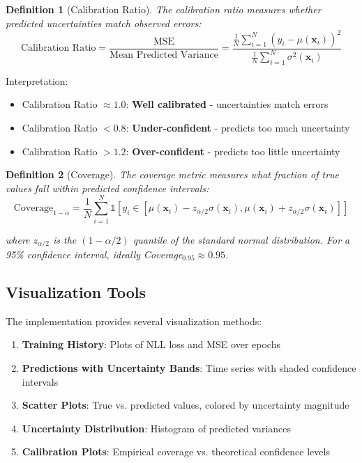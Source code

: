 \documentclass[11pt,a4paper]{article}
\newtheorem{definition}{Definition}
\begin{document}
\begin{definition}[Calibration Ratio]
The calibration ratio measures whether predicted uncertainties match observed errors:
\begin{equation}
\text{Calibration Ratio} = \frac{\text{MSE}}{\text{Mean Predicted Variance}} = \frac{\frac{1}{N}\sum_{i=1}^N (y_i - \mu(\mathbf{x}_i))^2}{\frac{1}{N}\sum_{i=1}^N \sigma^2(\mathbf{x}_i)}
\end{equation}
\end{definition}

Interpretation:
\begin{itemize}
    \item Calibration Ratio $\approx 1.0$: \textbf{Well calibrated} - uncertainties match errors
    \item Calibration Ratio $< 0.8$: \textbf{Under-confident} - predicts too much uncertainty
    \item Calibration Ratio $> 1.2$: \textbf{Over-confident} - predicts too little uncertainty
\end{itemize}

\begin{definition}[Coverage]
The coverage metric measures what fraction of true values fall within predicted confidence intervals:
\begin{equation}
\text{Coverage}_{1-\alpha} = \frac{1}{N}\sum_{i=1}^N \mathbb{1}[y_i \in [\mu(\mathbf{x}_i) - z_{\alpha/2}\sigma(\mathbf{x}_i), \mu(\mathbf{x}_i) + z_{\alpha/2}\sigma(\mathbf{x}_i)]]
\end{equation}

where $z_{\alpha/2}$ is the $(1-\alpha/2)$ quantile of the standard normal distribution. For a 95\% confidence interval, ideally Coverage$_{0.95} \approx 0.95$.
\end{definition}

\subsection{Visualization Tools}

The implementation provides several visualization methods:

\begin{enumerate}
    \item \textbf{Training History}: Plots of NLL loss and MSE over epochs
    \item \textbf{Predictions with Uncertainty Bands}: Time series with shaded confidence intervals
    \item \textbf{Scatter Plots}: True vs. predicted values, colored by uncertainty magnitude
    \item \textbf{Uncertainty Distribution}: Histogram of predicted variances
    \item \textbf{Calibration Plots}: Empirical coverage vs. theoretical confidence levels
\end{enumerate}
\end{document}

